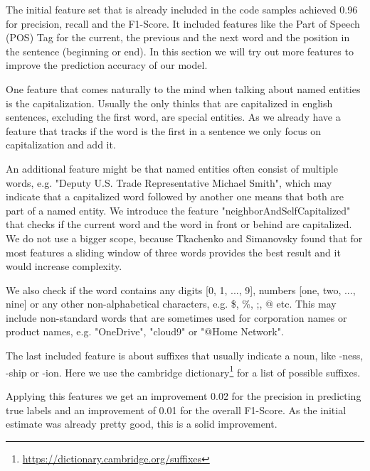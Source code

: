 \documentclass{support/acm_proc_article-sp}
\begin{document}
    The initial feature set that is already included in the code samples achieved 0.96 for precision, recall and the
    F1-Score.
    It included features like the Part of Speech (POS) Tag for the current, the previous and the next word and the
    position in the sentence (beginning or end).
    In this section we will try out more features to improve the prediction accuracy of our model.

    One feature that comes naturally to the mind when talking about named entities is the capitalization.
    Usually the only thinks that are capitalized in english sentences, excluding the first word, are special entities.
    As we already have a feature that tracks if the word is the first in a sentence we only focus on capitalization and
    add it.

    An additional feature might be that named entities often consist of multiple words, e.g. "Deputy U.S. Trade Representative
    Michael Smith", which may indicate that a capitalized word followed by another one means that both are part of a named
    entity.
    We introduce the feature "neighborAndSelfCapitalized" that checks if the current word and the word in front or behind
    are capitalized.
    We do not use a bigger scope, because Tkachenko and Simanovsky found that for most features a sliding window of three
    words provides the best result \cite{DBLP:conf:konvens:TkachenkoS12} and it would increase complexity.

    We also check if the word contains any digits [0, 1, ..., 9], numbers [one, two, ..., nine] or any other non-alphabetical
    characters, e.g. \$, \%, ;, @ etc.
    This may include non-standard words that are sometimes used for corporation names or product names, e.g. "OneDrive",
    "cloud9" or "@Home Network".

    The last included feature is about suffixes that usually indicate a noun, like -ness, -ship or -ion.
    Here we use the cambridge dictionary\footnote{\href{https://dictionary.cambridge.org/grammar/british-grammar/word-formation/suffixes}{https://dictionary.cambridge.org/suffixes}}
    for a list of possible suffixes.

    Applying this features we get an improvement 0.02 for the precision in predicting true labels and an improvement
    of 0.01 for the overall F1-Score.
    As the initial estimate was already pretty good, this is a solid improvement.

\end{document}
